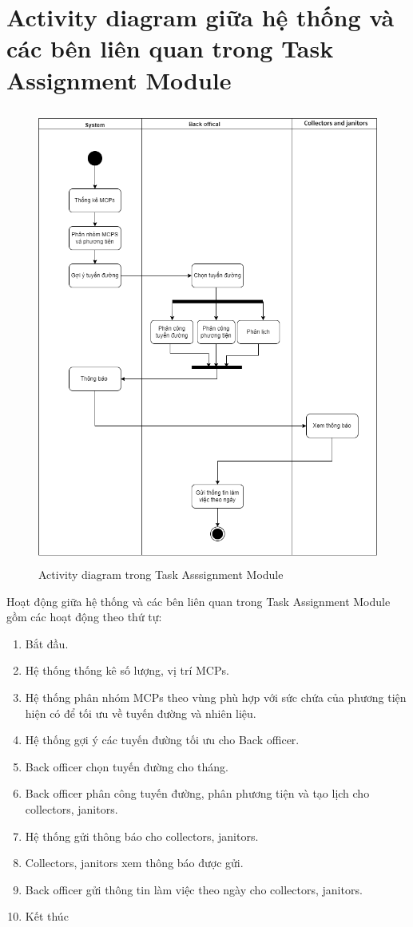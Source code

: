 \section{Activity diagram giữa hệ thống và các bên liên quan trong Task Assignment Module}
    \begin{figure}[h]
        \centering
        \includegraphics[width=15.0cm,height=15cm]{imgs/activity diagram/activity diagram.png}
        \caption{Activity diagram trong Task Asssignment Module}
    \end{figure}
    \newpage
    Hoạt động giữa hệ thống và các bên liên quan trong Task Assignment Module gồm các hoạt động theo thứ tự:
    \begin{enumerate}
        \item Bắt đầu.
        \item Hệ thống thống kê số lượng, vị trí MCPs.
        \item Hệ thống phân nhóm MCPs theo vùng phù hợp với sức chứa của phương tiện hiện có để tối ưu về tuyến đường và nhiên liệu.
        \item Hệ thống gợi ý các tuyến đường tối ưu cho Back officer.
        \item Back officer chọn tuyến đường cho tháng.
        \item Back officer phân công tuyến đường, phân phương tiện và tạo lịch cho collectors, janitors.
        \item Hệ thống gửi thông báo cho collectors, janitors.
        \item  Collectors, janitors xem thông báo được gửi.
        \item Back officer gửi thông tin làm việc theo ngày cho collectors, janitors.
        \item Kết thúc
    \end{enumerate}
